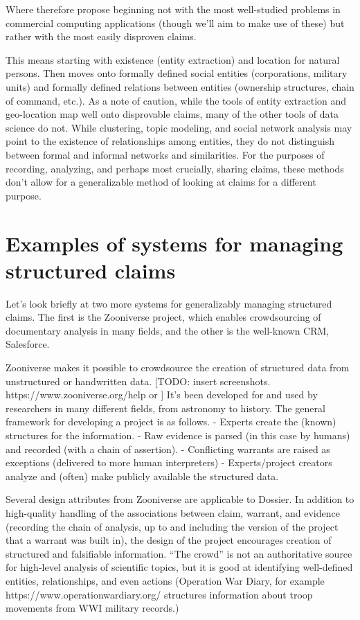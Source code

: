 \documentclass[format=siggraph, review=true]{acmart}
\begin{document}
Where therefore propose beginning not with the most well-studied problems in commercial computing applications (though we'll aim to make use of these) but rather with the most easily disproven claims. 

This means starting with existence (entity extraction) and location for natural persons. Then moves onto formally defined social entities (corporations, military units) and formally defined relations between entities (ownership structures, chain of command, etc.). As a note of caution, while the tools of entity extraction and geo-location map well onto disprovable claims, many of the other tools of data science do not. While clustering, topic modeling, and social network analysis may point to the existence of relationships among entities, they do not distinguish between formal and informal networks and similarities. For the purposes of recording, analyzing, and perhaps most crucially, sharing claims, these methods don't allow for a generalizable method of looking at claims for a different purpose.

\section{Examples of systems for managing structured claims}
Let's look briefly at two more systems for generalizably managing structured claims. The first is the Zooniverse project, which enables crowdsourcing of documentary analysis in many fields, and the other is the well-known CRM, Salesforce. 

Zooniverse makes it possible to crowdsource the creation of structured data from unstructured or handwritten data. [TODO: insert screenshots. https://www.zooniverse.org/help  or ] It's been developed for and used by researchers in many different fields, from astronomy to history. The general framework for developing a project is as follows.
- Experts create the (known) structures for the information. 
- Raw evidence is parsed (in this case by humans) and recorded (with a chain of assertion). 
- Conflicting warrants are raised as exceptions (delivered to more human interpreters)
- Experts/project creators analyze and (often) make publicly available the structured data. 

Several design attributes from Zooniverse are applicable to Dossier. In addition to high-quality handling of the associations between claim, warrant, and evidence (recording the chain of analysis, up to and including the version of the project that a warrant was built in), the design of the project encourages creation of structured and falsifiable information. ``The crowd'' is not an authoritative source for high-level analysis of scientific topics, but it is good at identifying well-defined entities, relationships, and even actions (Operation War Diary, for example https://www.operationwardiary.org/ structures information about troop movements from WWI military records.)
\end{document}
